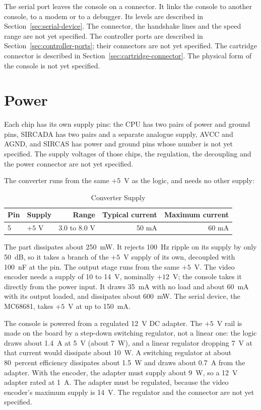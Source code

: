 The serial port leaves the console on a connector. It links the console to another console, to a modem or to a
debugger. Its levels are described in Section~\ref{sec:serial-device}. The connector, the handshake lines and the speed
range are not yet specified. The controller ports are described in Section~\ref{sec:controller-ports}; their connectors
are not yet specified. The cartridge connector is described in Section~\ref{sec:cartridge-connector}. The physical form
of the console is not yet specified.

\section{Power}
\label{sec:power}

Each chip has its own supply pins: the CPU has two pairs of power and ground pins, SIRCADA has two pairs and a separate
analogue supply, AVCC and AGND, and SIRCAS has power and ground pins whose number is not yet specified. The supply
voltages of those chips, the regulation, the decoupling and the power connector are not yet specified.

The converter runs from the same $+5$~V as the logic, and needs no other supply:

\begin{table}[H]
	\centering
	\begin{tabular}{llrrr}
		\toprule
		\textbf{Pin} & \textbf{Supply} & \textbf{Range} & \textbf{Typical current} & \textbf{Maximum current} \\
		\midrule
		5            & $+5$ V          & 3.0 to 8.0 V   & 50 mA                    & 60 mA                    \\
		\bottomrule
	\end{tabular}
	\caption{Converter Supply}
	\label{tab:converter-supplies}
\end{table}

\noindent The part dissipates about 250~mW. It rejects 100~Hz ripple on its supply by only 50~dB, so it takes a branch of
the $+5$~V supply of its own, decoupled with 100~nF at the pin. The output stage runs from the same $+5$~V. The video encoder needs a supply of 10 to 14~V, nominally $+12$~V; the console takes it directly from the power input. It draws 35~mA with no load and about
60~mA with its output loaded, and dissipates about 600~mW. The serial device, the MC68681, takes $+5$~V
at up to 150~mA.

\noindent The console is powered from a regulated 12~V DC adapter. The $+5$~V rail is made on the board by a step-down switching
regulator, not a linear one: the logic draws about 1.4~A at 5~V (about 7~W), and a linear regulator dropping 7~V at that
current would dissipate about 10~W. A switching regulator at about 80~percent efficiency dissipates about 1.5~W and draws about
0.7~A from the adapter. With the encoder, the adapter must supply about 9~W, so a 12~V adapter rated at 1~A. The adapter must be
regulated, because the video encoder's maximum supply is 14~V. The regulator and the connector are not yet specified.
